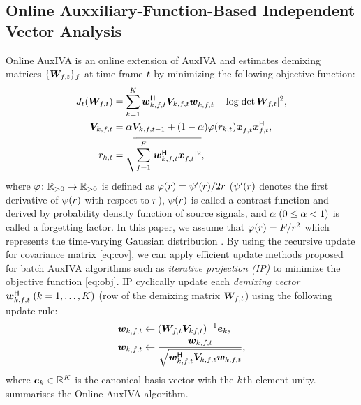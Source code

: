 \documentclass[sip,biber]{now-journal}
\begin{document}
\subsection{Online Auxxiliary-Function-Based Independent Vector Analysis}

Online AuxIVA \cite{Taniguchi:2014:HSCMA} is an online extension of AuxIVA \cite{Ono:2011:WASPAA} and estimates demixing matrices $\{\Demix _{\ft}\} _{\freq}$ at time frame $t$ by minimizing the following objective function:
\begin{align}
  J _{\tframe}(\Demix _{\ft}) &= \sum _{\src = 1} ^{\Src} \demix _{\src,\ft} ^{\hermite} \cov _{\src,\ft} \demix _{\src,\ft} ^{\nohermite} - \logdet{\Demix _{\ft}} ^2, \label{eq:obj} \\
  \cov _{\src,\ft} &= \forget \cov _{\src,\ft[-1]} + (1 - \forget) \weight(\var _{\src,\tframe}) \Obs _{\ft} ^{\nohermite} \Obs _{\ft} ^{\hermite}, \label{eq:cov} \\
  \var _{\src,\tframe} &= \sqrt{\sum _{\freq=1} ^{\Freq} \lvert \demix ^{\hermite} _{\src,\ft} \Obs ^{\nohermite}_{\ft} \rvert ^2},
\end{align}
where $\varphi\colon \mathbb{R} _{>0} \to \mathbb{R} _{>0}$ is defined as $\varphi(r) = \psi ' (r) / 2 r$ ($\psi '(r)$ denotes the first derivative of $\psi (r)$ with respect to $r$),
$\psi(r)$ is called a contrast function and derived by probability density function of source signals,
and $\alpha\; (0 \leq \alpha < 1)$ is called a forgetting factor.
In this paper, we assume that $\varphi (r) = F/{r ^2}$ which represents the time-varying Gaussian distribution \cite{Ono:2012:APSIPA}.
By using the recursive update for covariance matrix \eqref{eq:cov}, we can apply efficient update methods proposed for batch AuxIVA algorithms such as \emph{iterative projection (IP)} \cite{Ono:2011:WASPAA} to minimize the objective function \eqref{eq:obj}.
IP cyclically update each \emph{demixing vector} $\demix _{\src,\ft} ^{\hermite}\; (\src = 1, \dots, \Src)$ (row of the demixing matrix $\Demix _{\ft}$) using the following update rule:
\begin{align}
  \demix _{\src,\ft} &\gets (\Demix _{\ft} \cov _{\src\ft}) ^{-1} \eye _{\src} \label{eq:ip:proj}, \\
  \demix _{\src,\ft} &\gets \frac{{\demix _{\src,\ft}}}{{\sqrt{\demix _{\src,\ft} ^{\hermite} \cov _{\src,\ft} \demix _{\src,\ft}}}} \label{eq:ip:norm},
\end{align}
where $\bm{e} _{k} \in \mathbb{R} ^{K}$ is the canonical basis vector with the $k$th element unity.
 summarises the Online AuxIVA algorithm.
\end{document}

